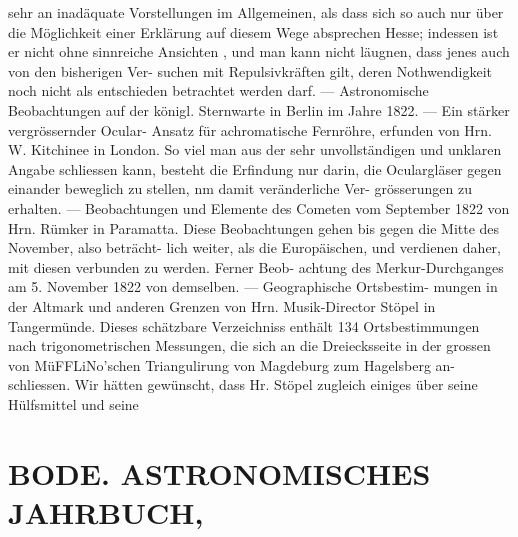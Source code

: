 \documentclass[12pt,a4paper]{article}
\begin{document}
{{{{{{{{ sehr  an  inadäquate  Vorstellungen  im  Allgemeinen,    als   dass  sich so  auch  nur  über  die  Möglichkeit  einer  Erklärung  auf  diesem  Wege  absprechen  Hesse;  indessen  ist  er nicht  ohne  sinnreiche  Ansichten ,  und  man  kann  nicht  läugnen,  dass  jenes  auch  von  den  bisherigen  Ver- suchen mit  Repulsivkräften  gilt,    deren  Nothwendigkeit  noch   nicht  als  entschieden  betrachtet  werden darf.  ---      Astronomische  Beobachtungen   auf  der  königl.  Sternwarte    in  Berlin  im  Jahre  1822.  ---     Ein stärker  vergrössernder  Ocular- Ansatz  für  achromatische  Fernröhre,    erfunden  von   Hrn.  W.  Kitchinee  in London.    So  viel  man  aus  der  sehr  unvollständigen  und  unklaren  Angabe  schliessen  kann,   besteht  die Erfindung  nur  darin,  die  Oculargläser  gegen  einander  beweglich  zu  stellen,  nm  damit  veränderliche  Ver- grösserungen  zu  erhalten.  ---     Beobachtungen  und  Elemente  des  Cometen  vom  September  1822  von  Hrn. Rümker  in  Paramatta.    Diese  Beobachtungen  gehen  bis  gegen  die  Mitte  des  November,    also  beträcht- lich weiter,  als  die  Europäischen,  und  verdienen  daher,  mit  diesen  verbunden  zu  werden.     Ferner  Beob- achtung des  Merkur-Durchganges   am  5.  November  1822  von  demselben.  ---     Geographische   Ortsbestim- mungen in  der  Altmark  und  anderen  Grenzen  von  Hrn.  Musik-Director  Stöpel  in  Tangermünde.     Dieses schätzbare  Verzeichniss  enthält  134  Ortsbestimmungen   nach   trigonometrischen  Messungen,    die   sich  an die  Dreiecksseite  in  der  grossen   von  MüFFLiNo'schen  Triangulirung  von  Magdeburg  zum  Hagelsberg  an- schliessen.      Wir  hätten  gewünscht,  dass  Hr.  Stöpel   zugleich   einiges   über   seine  Hülfsmittel  und  seine


\section*{BODE.     ASTRONOMISCHES  JAHRBUCH,}

}}}}}}}}
\end{document}
